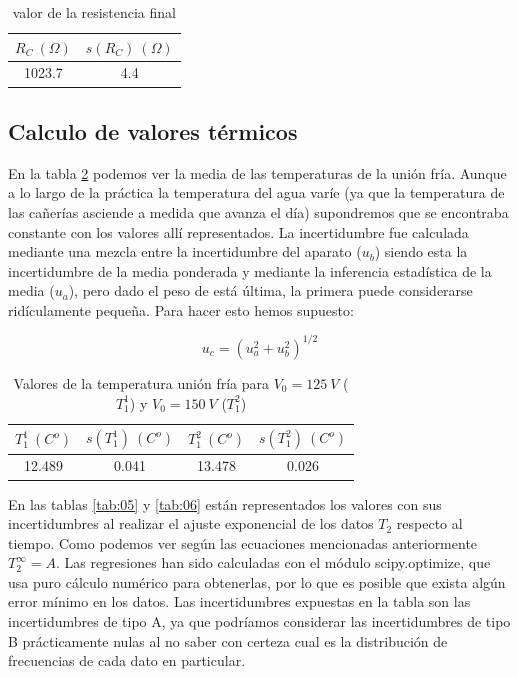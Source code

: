 \documentclass[12pt,a4paper]{article}
\newcommand{\parentesis}[1]{\left( #1  \right)}
\begin{document}
\begin{table}[h!] 	 \centering 
\begin{tabular}{|c|c|} 
\hline 
 $R_C \ (\Omega)$ & $s(R_C) \ (\Omega)$  \\ \hline 
1023.7  & 4.4  \\ 
\hline
\end{tabular} 
\caption{valor de la resistencia final} 
\label{tab:} 
\end{table} 


\newpage



\subsection{Calculo de valores térmicos}


En la tabla \ref{tab:04} podemos ver la media de las temperaturas de la unión fría. Aunque a lo largo de la práctica la temperatura del agua varíe (ya que la temperatura de las cañerías asciende a medida que avanza el día) supondremos que se encontraba constante con los valores allí representados. La incertidumbre fue calculada mediante una mezcla entre la incertidumbre del aparato ($u_b$) siendo esta la incertidumbre de la media ponderada y mediante la inferencia estadística de la media ($u_a$), pero dado el peso de está última, la primera puede considerarse ridículamente pequeña. Para hacer esto hemos supuesto:


\begin{equation}
u_c = \parentesis{u_a^2 + u_b^2}^{1/2} 
\end{equation}

\begin{table}[h!] 	 \centering 
\begin{tabular}{|c|c||c|c|} 
\hline 
$ T_1^1  \ (C^o)$ & $s( T_1^1) \ (C^o)$  & $ T_1^2  \ (C^o)$ & $s( T_1^2) \ (C^o) $ \\ \hline  
 12.489 &  0.041 &  13.478  & 0.026 \\ \hline 
\end{tabular} 
\caption{Valores de la temperatura unión fría para $V_0 = 125 \ V$ ($ T_1^1$) y $V_0 = 150 \ V$ ($ T_1^2$)} 
\label{tab:04} 
\end{table} 


En las tablas \ref{tab:05} y \ref{tab:06} están representados los valores con sus incertidumbres al realizar el ajuste exponencial de los datos $T_2$ respecto al tiempo. Como podemos ver según las ecuaciones mencionadas anteriormente $T_2^{\infty} = A$. Las regresiones han sido calculadas con el módulo scipy.optimize, que usa puro cálculo numérico para obtenerlas, por lo que es posible que exista algún error mínimo en los datos. Las incertidumbres expuestas en la tabla son las incertidumbres de tipo A, ya que podríamos considerar las incertidumbres de tipo B prácticamente nulas al no saber con certeza cual es la distribución de frecuencias de cada dato en particular. 
\end{document}
